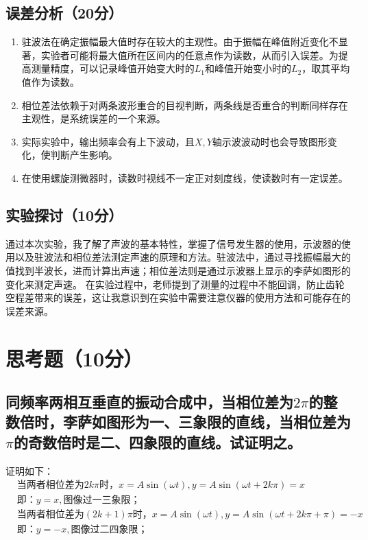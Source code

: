 \documentclass{../../templates/Report}
\begin{document}
\begin{fullreportonly}
	\subsection{误差分析（20分）}
	\begin{enumerate}
    \item 驻波法在确定振幅最大值时存在较大的主观性。由于振幅在峰值附近变化不显著，实验者可能将最大值所在区间内的任意点作为读数，从而引入误差。为提高测量精度，可以记录峰值开始变大时的$L_1$和峰值开始变小时的$L_2$，取其平均值作为读数。
    \item 相位差法依赖于对两条波形重合的目视判断，两条线是否重合的判断同样存在主观性，是系统误差的一个来源。
    \item 实际实验中，输出频率会有上下波动，且$X, Y$轴示波波动时也会导致图形变化，使判断产生影响。
    \item 在使用螺旋测微器时，读数时视线不一定正对刻度线，使读数时有一定误差。
	\end{enumerate}

	\subsection{实验探讨（10分）}
	通过本次实验，我了解了声波的基本特性，掌握了信号发生器的使用，示波器的使用以及驻波法和相位差法测定声速的原理和方法。驻波法中，通过寻找振幅最大的值找到半波长，进而计算出声速；相位差法则是通过示波器上显示的李萨如图形的变化来测定声速。
	在实验过程中，老师提到了测量的过程中不能回调，防止齿轮空程差带来的误差，这让我意识到在实验中需要注意仪器的使用方法和可能存在的误差来源。
	\section{思考题（10分）}
	\subsection{同频率两相互垂直的振动合成中，当相位差为$2\pi$的整数倍时，李萨如图形为一、三象限的直线，当相位差为$\pi$的奇数倍时是二、四象限的直线。试证明之。}
	证明如下：
	\begin{align*}
		&\text{当两者相位差为}2k\pi\text{时}，x = A\sin(\omega t), y = A\sin(\omega t + 2k\pi) = x \\
		&\text{即：}y = x, \text{图像过一三象限；}\\
		&\text{当两者相位差为}(2k + 1)\pi\text{时}，x = A\sin(\omega t), y = A\sin(\omega t + 2k\pi + \pi) = -x \\
		&\text{即：}y = -x, \text{图像过二四象限；}\\
	\end{align*}

\end{fullreportonly}
\end{document}

